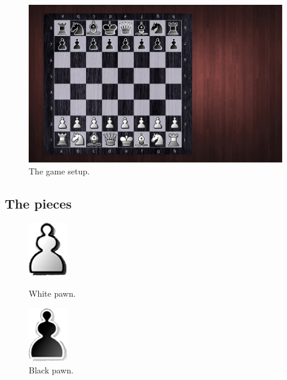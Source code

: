 \documentclass[12pt, a4paper]{article}
\begin{document}
\begin{figure}[h!]
\centering
\includegraphics[width=0.9\linewidth]{figures/boardwithpieces.jpg}
\caption{The game setup.}
\end{figure}

\vfill
\clearpage

\newpage
\vfill
\subsection{The pieces}

\begin{figure}[h!]
\centering
\begin{minipage}{.5\textwidth}
  \centering
  \includegraphics[width=.4\linewidth]{figures/whitepawn.png}
  \caption{White pawn.}
\end{minipage}%
\begin{minipage}{.5\textwidth}
  \centering
  \includegraphics[width=.4\linewidth]{figures/blackpawn.png}
  \caption{Black pawn.}
\end{minipage}
\end{figure}
\end{document}
